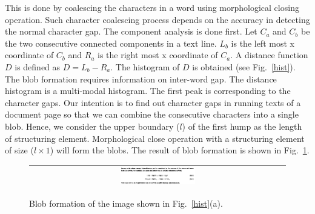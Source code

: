 This is done by coalescing the characters in a word using morphological closing operation. Such character coalescing process depends on the accuracy in detecting the normal character gap. The component analysis is done first. Let $C_a$ and $C_b$ be the two consecutive connected
components in a text line. $L_b$ is the left most x coordinate of $C_b$ and $R_a$ is the right most x coordinate of $C_a$. A distance function $D$ is defined as  $D = L_b - R_a$. The histogram of $D$ is obtained (see Fig.~\ref{hist}). The blob
formation requires information on inter-word gap. The distance histogram is a multi-modal histogram. The first peak is
corresponding to the character gaps. Our intention is to find out character gaps in running texts of a document page so that
we can combine the consecutive characters into a single blob. Hence, we consider the upper boundary ($l$) of the first hump as
the length of structuring element. Morphological close operation with a structuring element of size ($l\times 1$) will form the
blobs. The result of blob formation is shown in Fig.~\ref{BLOB_FORM}. 
\begin{figure}[h]
\center\footnotesize
\begin{tabular}{|c|} 
\hline
\includegraphics[width=0.3\textwidth]{blob.png}\\
\hline
\end{tabular}
\caption{Blob formation of the image shown in Fig.~\ref{hist}(a). } 
\label{BLOB_FORM} 
\end{figure}
